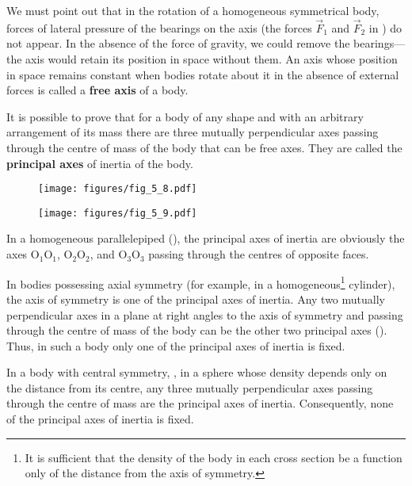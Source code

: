 We must point out that in the rotation of a homogeneous symmetrical body, forces of lateral pressure of the bearings on the axis (the forces $\vec{F}_1$ and $\vec{F}_2$ in ) do not appear. In the absence of the force of gravity, we could remove the bearings---the axis would retain its position in space without them. An axis whose position in space remains constant when bodies rotate about it in the absence of external forces is called a \textbf{free axis} of a body.

It is possible to prove that for a body of any shape and with an arbitrary arrangement of its mass there are three mutually perpendicular axes passing through the centre of mass of the body that can be free axes. They are called the \textbf{principal axes} of inertia of the body.

\begin{figure}[t]
	\begin{minipage}[t]{0.5\linewidth}
		\begin{center}
			\texttt{[image: figures/fig\_5\_8.pdf]}
			\caption[]{}
			\label{fig:5_8}
		\end{center}
	\end{minipage}
	\hspace{-0.05cm}
	\begin{minipage}[t]{0.5\linewidth}
		\begin{center}
			\texttt{[image: figures/fig\_5\_9.pdf]}
			\caption[]{}
			\label{fig:5_9}
		\end{center}
	\end{minipage}
\vspace{-0.7cm}
\end{figure}

In a homogeneous parallelepiped (), the principal axes of inertia are obviously the axes O$_1$O$_1$, O$_2$O$_2$, and O$_3$O$_3$ passing through the centres of opposite faces.

In bodies possessing axial symmetry (for example, in a homogeneous\footnote{It is sufficient that the density of the body in each cross section be a function only of the distance from the axis of symmetry.} cylinder), the axis of symmetry is one of the principal axes of inertia. Any two mutually perpendicular axes in a plane at right angles to the axis of symmetry and passing through the centre of mass of the body can be the other two principal axes (). Thus, in such a body only one of the principal axes of inertia is fixed.

In a body with central symmetry, \ie, in a sphere whose density depends only on the distance from its centre, any three mutually perpendicular axes passing through the centre of mass are the principal axes of inertia. Consequently, none of the principal axes of inertia is fixed. 

